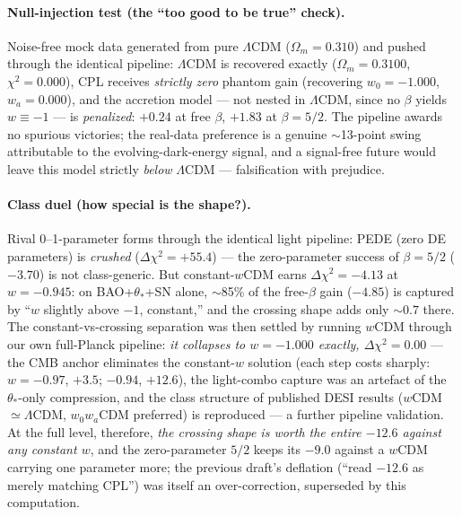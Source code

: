\documentclass[11pt]{article}
\begin{document}
\paragraph{Null-injection test (the ``too good to be true'' check).} Noise-free mock data generated from pure $\Lambda$CDM ($\Omega_m = 0.310$) and pushed through the identical pipeline: $\Lambda$CDM is recovered exactly ($\Omega_m = 0.3100$, $\chi^2 = 0.000$), CPL receives \emph{strictly zero} phantom gain (recovering $w_0 = -1.000$, $w_a = 0.000$), and the accretion model --- not nested in $\Lambda$CDM, since no $\beta$ yields $w \equiv -1$ --- is \emph{penalized}: $+0.24$ at free $\beta$, $+1.83$ at $\beta = 5/2$. The pipeline awards no spurious victories; the real-data preference is a genuine $\sim$13-point swing attributable to the evolving-dark-energy signal, and a signal-free future would leave this model strictly \emph{below} $\Lambda$CDM --- falsification with prejudice.

\paragraph{Class duel (how special is the shape?).} Rival 0--1-parameter forms through the identical light pipeline: PEDE (zero DE parameters) is \emph{crushed} ($\Delta\chi^2 = +55.4$) --- the zero-parameter success of $\beta = 5/2$ ($-3.70$) is not class-generic. But constant-$w$CDM earns $\Delta\chi^2 = -4.13$ at $w = -0.945$: on BAO+$\theta_*$+SN alone, $\sim$85\% of the free-$\beta$ gain ($-4.85$) is captured by ``$w$ slightly above $-1$, constant,'' and the crossing shape adds only $\sim 0.7$ there. The constant-vs-crossing separation was then settled by running $w$CDM through our own full-Planck pipeline: \emph{it collapses to $w = -1.000$ exactly, $\Delta\chi^2 = 0.00$} --- the CMB anchor eliminates the constant-$w$ solution (each step costs sharply: $w=-0.97$, $+3.5$; $-0.94$, $+12.6$), the light-combo capture was an artefact of the $\theta_*$-only compression, and the class structure of published DESI results ($w$CDM $\simeq \Lambda$CDM, $w_0w_a$CDM preferred) is reproduced --- a further pipeline validation. At the full level, therefore, \emph{the crossing shape is worth the entire $-12.6$ against any constant $w$}, and the zero-parameter $5/2$ keeps its $-9.0$ against a $w$CDM carrying one parameter more; the previous draft's deflation (``read $-12.6$ as merely matching CPL'') was itself an over-correction, superseded by this computation.
\end{document}
